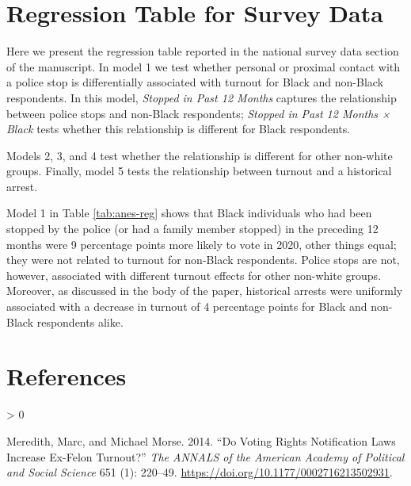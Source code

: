 \documentclass[
  12pt,
]{article}
\newlength{\cslhangindent}
\newenvironment{CSLReferences}[2] %
 {%
  \setlength{\parindent}{0pt}
  \ifodd #1 \everypar{\setlength{\hangindent}{\cslhangindent}}\ignorespaces\fi
  \ifnum #2 > 0
  \setlength{\parskip}{#2\baselineskip}
  \fi
 }%
 {}
\begin{document}
\begin{singlespace}

\end{singlespace}

\hypertarget{regression-table-for-survey-data}{%
\section*{Regression Table for Survey Data}\label{regression-table-for-survey-data}}

Here we present the regression table reported in the national survey data section of the manuscript. In model 1 we test whether personal or proximal contact with a police stop is differentially associated with turnout for Black and non-Black respondents. In this model, \emph{Stopped in Past 12 Months} captures the relationship between police stops and non-Black respondents; \emph{Stopped in Past 12 Months × Black} tests whether this relationship is different for Black respondents.

Models 2, 3, and 4 test whether the relationship is different for other non-white groups. Finally, model 5 tests the relationship between turnout and a historical arrest.

\begin{singlespace}

\end{singlespace}

Model 1 in Table \ref{tab:anes-reg} shows that Black individuals who had been stopped by the police (or had a family member stopped) in the preceding 12 months were 9 percentage points more likely to vote in 2020, other things equal; they were not related to turnout for non-Black respondents. Police stops are not, however, associated with different turnout effects for other non-white groups. Moreover, as discussed in the body of the paper, historical arrests were uniformly associated with a decrease in turnout of 4 percentage points for Black and non-Black respondents alike.

\newpage

\hypertarget{references}{%
\section*{References}\label{references}}

\hypertarget{refs}{}
\begin{CSLReferences}{1}{0}
\leavevmode\hypertarget{ref-Meredith2014}{}%
Meredith, Marc, and Michael Morse. 2014. {``Do {Voting Rights Notification Laws Increase Ex}-{Felon Turnout}?''} \emph{The ANNALS of the American Academy of Political and Social Science} 651 (1): 220--49. \url{https://doi.org/10.1177/0002716213502931}.

\end{CSLReferences}
\end{document}
